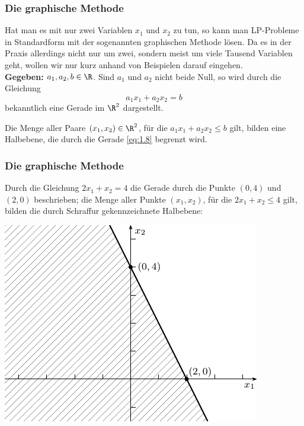 \documentclass[smaller]{beamer}
\begin{document}
\begin{frame}
 \frametitle{Die graphische Methode}
 Hat man es mit nur zwei Variablen $x_1$ und $x_2$ zu tun, so kann man 
LP-Probleme in Standardform mit der sogenannten graphischen Methode lösen. Da es in der Praxis allerdings nicht nur um zwei, sondern meist um viele Tausend Variablen geht, wollen wir nur kurz anhand von Beispielen
darauf eingehen. \\
\vspace*{0.2cm}
\textbf{Gegeben:} $a_1, a_2, b \in \R$. Sind $a_1$ und $a_2$ nicht beide Null, so wird durch die Gleichung
\begin{equation} \label{eq:1.8}
                a_1x_1 + a_2x_2 = b
\end{equation}
bekanntlich eine Gerade im $\R^2$ dargestellt. 

Die Menge aller Paare $(x_1, x_2) \in \R^2$, für die $a_1x_1 + a_2x_2 \le b$ gilt, bilden eine Halbebene, die durch die Gerade \eqref{eq:1.8} begrenzt wird.
\end{frame}

\begin{frame}
 \frametitle{Die graphische Methode}
 Durch die Gleichung $2x_1+x_2=4$
die Gerade durch die Punkte $(0,4)$ und $(2,0)$ beschrieben; die Menge aller Punkte $(x_1, x_2)$, für die $2x_1+x_2 \leq 4$
gilt, bilden die durch Schraffur gekennzeichnete Halbebene:

\begin{center}
\includegraphics{fig1.pdf}
\end{center}
\end{frame}
\end{document}
